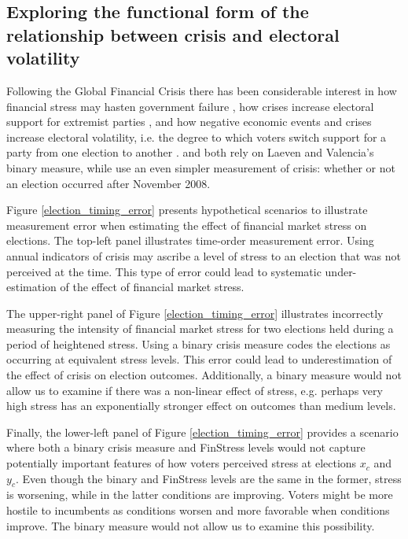 \documentclass[]{article}
\begin{document}
\subsection{Exploring the functional form of the relationship between crisis and electoral volatility}

Following the Global Financial Crisis there has been considerable interest in how financial stress may hasten government failure \citep{CrespoTenorio2014}, how crises increase electoral support for extremist parties \citep{Funke2015}, and how negative economic events and crises increase electoral volatility, i.e. the degree to which voters switch support for a party from one election to another \citep{Mainwaring2016,Hernandez2015}. \cite{CrespoTenorio2014} and \cite{Funke2015} both rely on Laeven and Valencia's binary measure, while \cite{Hernandez2015} use an even simpler measurement of crisis: whether or not an election occurred after November 2008.



Figure \ref{election_timing_error} presents hypothetical scenarios to illustrate measurement error when estimating the effect of financial market stress on elections. The top-left panel illustrates time-order measurement error. Using annual indicators of crisis may ascribe a level of stress to an election that was not perceived at the time. This type of error could lead to systematic under-estimation of the effect of financial market stress.

The upper-right panel of Figure \ref{election_timing_error} illustrates incorrectly measuring the intensity of financial market stress for two elections held during a period of heightened stress. Using a binary crisis measure codes the elections as occurring at equivalent stress levels. This error could lead to underestimation of the effect of crisis on election outcomes. Additionally, a binary measure would not allow us to examine if there was a non-linear effect of stress, e.g. perhaps very high stress has an exponentially stronger effect on outcomes than medium levels.

Finally, the lower-left panel of Figure \ref{election_timing_error} provides a scenario where both a binary crisis measure and FinStress levels would not capture potentially important features of how voters perceived stress at elections $x_{c}$ and $y_{c}$. Even though the binary and FinStress levels are the same in the former, stress is worsening, while in the latter conditions are improving. Voters might be more hostile to incumbents as conditions worsen and more favorable when conditions improve. The binary measure would not allow us to examine this possibility.
\end{document}
